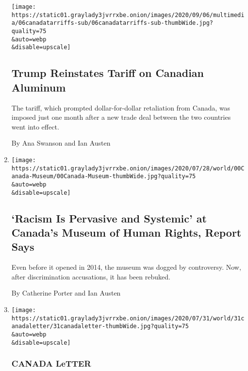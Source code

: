 \begin{enumerate}
  \texttt{[image: https://static01.graylady3jvrrxbe.onion/images/2020/09/06/multimedia/06canadatarriffs-sub/06canadatarriffs-sub-thumbWide.jpg?quality=75\\\&auto=webp\\\&disable=upscale]}

  \hypertarget{trump-reinstates-tariff-on-canadian-aluminum}{%
  \subsection{Trump Reinstates Tariff on Canadian
  Aluminum}\label{trump-reinstates-tariff-on-canadian-aluminum}}

  The tariff, which prompted dollar-for-dollar retaliation from Canada,
  was imposed just one month after a new trade deal between the two
  countries went into effect.

  By Ana Swanson and Ian Austen
\item
  \href{/2020/08/06/world/canada/museum-of-human-rights-discrimination.html}{}

  \texttt{[image: https://static01.graylady3jvrrxbe.onion/images/2020/07/28/world/00Canada-Museum/00Canada-Museum-thumbWide.jpg?quality=75\\\&auto=webp\\\&disable=upscale]}

  \hypertarget{racism-is-pervasive-and-systemic-at-canadas-museum-of-human-rights-report-says}{%
  \subsection{`Racism Is Pervasive and Systemic' at Canada's Museum of
  Human Rights, Report
  Says}\label{racism-is-pervasive-and-systemic-at-canadas-museum-of-human-rights-report-says}}

  Even before it opened in 2014, the museum was dogged by controversy.
  Now, after discrimination accusations, it has been rebuked.

  By Catherine Porter and Ian Austen
\item
  \href{/2020/07/31/world/canada/leone-farrell-chemist.html}{}

  \texttt{[image: https://static01.graylady3jvrrxbe.onion/images/2020/07/31/world/31canadaletter/31canadaletter-thumbWide.jpg?quality=75\\\&auto=webp\\\&disable=upscale]}

  \hypertarget{canada-letter-2}{%
  \subsubsection{CANADA LeTTER}\label{canada-letter-2}}

  \hypertarget{canadas-key-role-in-creating-a-once-awaited-vaccine}{%
}
\end{enumerate}
